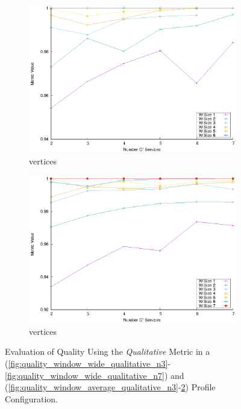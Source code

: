 \begin{figure}[!htb]
\begin{subfigure}{0.48\textwidth}
    \includegraphics[width=\textwidth]{Images/graphs/window_quality_performance_diff_qual_n7_s7_50_80_n6}
    \caption{ vertices}
    \label{fig:quality_window_average_qualitative_n6}
  \end{subfigure}
  \hfill
  \begin{subfigure}{0.48\textwidth}
    \includegraphics[width=\textwidth]{Images/graphs/window_quality_performance_diff_qual_n7_s7_50_80_n7}
    \caption{ vertices}
    \label{fig:quality_window_average_qualitative_n7}
  \end{subfigure}

  \caption{Evaluation of Quality Using the \emph{Qualitative} Metric in a \wide (\cref{fig:quality_window_wide_qualitative_n3}-\cref{fig:quality_window_wide_qualitative_n7}) and \average (\cref{fig:quality_window_average_qualitative_n3}-\cref{fig:quality_window_average_qualitative_n7}) Profile Configuration.}  \label{fig:quality_window_qualitative}

\end{figure}



